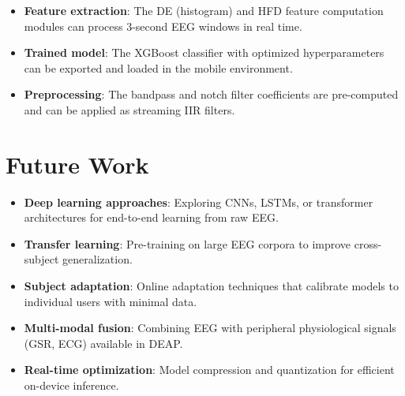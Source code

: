 \documentclass[12pt,a4paper]{report}
\begin{document}
\begin{itemize}[noitemsep]
    \item \textbf{Feature extraction}: The DE (histogram) and HFD feature
          computation modules can process 3-second EEG windows in real time.
    \item \textbf{Trained model}: The XGBoost classifier with optimized
          hyperparameters can be exported and loaded in the mobile environment.
    \item \textbf{Preprocessing}: The bandpass and notch filter coefficients
          are pre-computed and can be applied as streaming IIR filters.
\end{itemize}



\section{Future Work}

\begin{itemize}
    \item \textbf{Deep learning approaches}: Exploring CNNs, LSTMs, or
          transformer architectures for end-to-end learning from raw EEG.
    \item \textbf{Transfer learning}: Pre-training on large EEG corpora to
          improve cross-subject generalization.
    \item \textbf{Subject adaptation}: Online adaptation techniques that
          calibrate models to individual users with minimal data.
    \item \textbf{Multi-modal fusion}: Combining EEG with peripheral
          physiological signals (GSR, ECG) available in DEAP.
    \item \textbf{Real-time optimization}: Model compression and quantization
          for efficient on-device inference.
\end{itemize}
\end{document}
